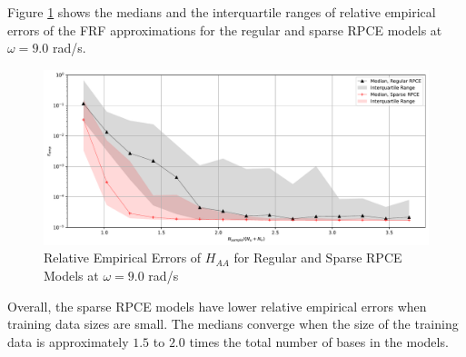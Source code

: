 Figure \ref{FRF_sRPCE_A_A_2} shows the medians and the interquartile ranges of relative empirical errors of the FRF approximations for the regular and sparse RPCE models at $\omega=9.0$ rad/s.
\begin{figure}[H]
    \centering
    \includegraphics[width=1.0\textwidth]{
        plots/surrogate/plot_1_A_2.pdf
    }
    \caption{%
        Relative Empirical Errors of $H_{AA}$ for Regular and Sparse RPCE Models at $\omega=9.0$ rad/s
    }
    \label{FRF_sRPCE_A_A_2}
\end{figure}
Overall, the sparse RPCE models have lower relative empirical errors when training data sizes are small.
The medians converge when the size of the training data is approximately $1.5$ to $2.0$ times the total number of bases in the models.

